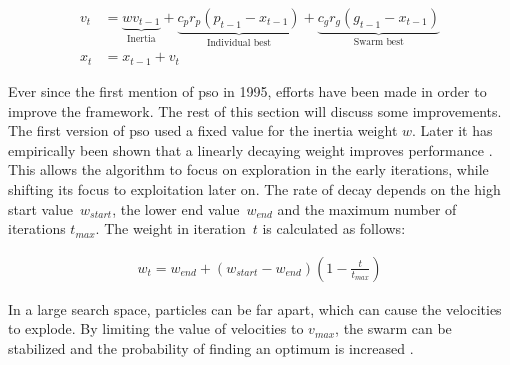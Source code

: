 
\begin{align} 
v_{t} &= \underbrace{wv_{t-1}}_\text{Inertia} + \underbrace{c_pr_p(p_{t-1} - x_{t-1})}_\text{Individual best} + \underbrace{c_gr_g(g_{t-1} - x_{t-1})}_\text{Swarm best} \label{eq:velocity_update}\\
x_{t} &= x_{t-1} + v_{t} \label{eq:position_update}
\end{align}

Ever since the first mention of \gls{pso} in 1995, efforts have been made in order to improve the framework. The rest of this section will discuss some improvements.\\

The first version of \gls{pso} used a fixed value for the inertia weight $w$. Later it has empirically been shown that a linearly decaying weight improves performance \cite{pso_study}. This allows the algorithm to focus on exploration in the early iterations, while shifting its focus to exploitation later on. The rate of decay depends on the high start value~$w_{start}$, the lower end value~$w_{end}$ and the maximum number of iterations $t_{max}$. The weight in iteration~$t$ is calculated as follows:

\begin{align}
w_t = w_{end} + (w_{start} - w_{end})\left(1 - \frac{t}{t_{max}}\right) \label{eq:weight}
\end{align}

In a large search space, particles can be far apart, which can cause the velocities to explode. By limiting the value of velocities to $v_{max}$, the swarm can be stabilized and the probability of finding an optimum is increased \cite{pso}.\\

